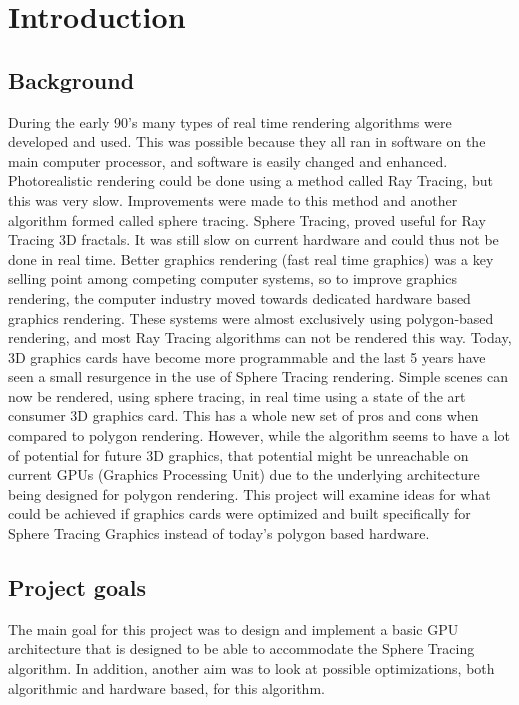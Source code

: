 \chapter{Introduction} 
	
	\section{Background}
		During the early 90’s many types of real time rendering algorithms were 
		developed and used. This was possible because they all ran in software 
		on the main computer processor, and software is easily changed and 
		enhanced. Photorealistic rendering could be done using a method called 
		Ray Tracing, but this was very slow. Improvements were made to this method
		and another algorithm formed called sphere tracing.
		 Sphere Tracing,  proved useful for Ray Tracing 
		3D fractals. It was still slow on current hardware and could 
		thus not be done in real time. Better graphics rendering
		(fast real time graphics) was a key selling point among competing 
		computer systems, so to improve graphics rendering, the 
		computer industry moved towards dedicated hardware based graphics 
		rendering. These systems were almost exclusively using polygon-based 
		rendering, and most Ray Tracing algorithms can not be rendered this 
		way. Today, 3D graphics cards have become more programmable and the 
		last 5 years have seen a small resurgence in the use of Sphere Tracing
		rendering. Simple scenes can now be rendered, using sphere tracing,
		 in real time using a state of the art consumer 3D graphics card.
		  This has a whole new set of pros 
		and cons when compared to polygon rendering. However, while 
		the algorithm seems to have a lot of potential for future 3D graphics, 
		that potential might be unreachable on current GPUs 
		(Graphics Processing Unit) due 
		to the underlying architecture being designed for polygon rendering. 
		This project will examine ideas for what could be achieved if graphics 
		cards were optimized and built specifically for Sphere Tracing Graphics
		instead of today’s polygon based hardware.
		 
	
	\section{Project goals}

		The main goal for this project was to design and implement a basic GPU 
		architecture that is designed to be able to accommodate the Sphere 
		Tracing algorithm. In addition, another aim was to look at possible 
		optimizations, both algorithmic	and hardware based, for this algorithm.
		
